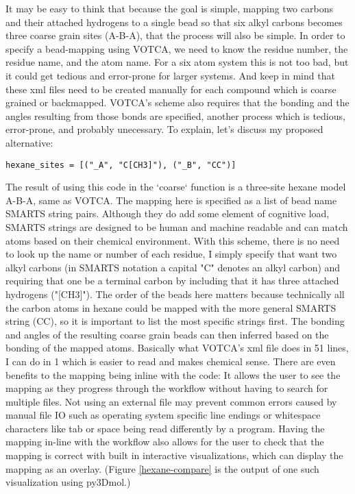 It may be easy to think that because the goal is simple, mapping two carbons and their attached hydrogens to a single bead so that six alkyl carbons becomes three coarse grain sites (A-B-A), that the process will also be simple.
In order to specify a bead-mapping using VOTCA, we need to know the residue number, the residue name, and the atom name.
For a six atom system this is not too bad, but it could get tedious and error-prone for larger systems.
And keep in mind that these xml files need to be created manually for each compound which is coarse grained or  backmapped.
VOTCA's scheme also requires that the bonding and the angles resulting from those bonds are specified, another process which is tedious, error-prone, and probably unecessary. 
To explain, let's discuss my proposed alternative:
\begin{lstlisting}
hexane_sites = [("_A", "C[CH3]"), ("_B", "CC")]
\end{lstlisting}
The result of using this code in the `coarse` function is a three-site hexane model A-B-A, same as VOTCA.%
The mapping here is specified as a list of bead name SMARTS string pairs.
Although they do add some element of cognitive load, SMARTS strings are designed to be human and machine readable and can match atoms based on their chemical environment.
With this scheme, there is no need to look up the name or number of each residue, I simply specify that want two alkyl carbons (in SMARTS notation a capital "C" denotes an alkyl carbon) and requiring that one be a terminal carbon by including that it has three attached hydrogens ("[CH3]").
The order of the beads here matters because technically all the carbon atoms in hexane could be mapped with the more general SMARTS string (CC), so it is important to list the most specific strings first.
The bonding and angles of the resulting coarse grain beads can then inferred based on the bonding of the mapped atoms.
Basically what VOTCA's xml file does in 51 lines, I can do in 1 which is easier to read and makes chemical sense. 
There are even benefits to the mapping being inline with the code:
It allows the user to see the mapping as they progress through the workflow without having to search for multiple files.
Not using an external file may prevent common errors caused by manual file IO such as operating system specific line endings or whitespace characters like tab or space being read differently by a program.
Having the mapping in-line with the workflow also allows for the user to check that the mapping is correct with built in interactive visualizations, which can display the mapping as an overlay. 
(Figure \ref{hexane-compare} is the output of one such visualization using py3Dmol.) %

